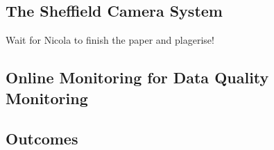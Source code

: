 \subsection{The Sheffield Camera System}\label{sec:35tonCameraSystem}

Wait for Nicola to finish the paper and plagerise!

\subsection{Online Monitoring for Data Quality Monitoring}\label{sec:35tonOnlineMonitoring}

\subsection{Outcomes}\label{sec:35tonPhaseIIOutcomes}





































